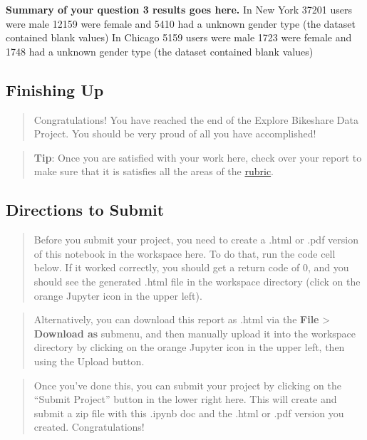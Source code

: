 \documentclass[11pt]{article}
\begin{document}
    \textbf{Summary of your question 3 results goes here.} In New York 37201
users were male 12159 were female and 5410 had a unknown gender type
(the dataset contained blank values) In Chicago 5159 users were male
1723 were female and 1748 had a unknown gender type (the dataset
contained blank values)

    \hypertarget{finishing-up}{%
\subsection{Finishing Up}\label{finishing-up}}

\begin{quote}
Congratulations! You have reached the end of the Explore Bikeshare Data
Project. You should be very proud of all you have accomplished!
\end{quote}

\begin{quote}
\textbf{Tip}: Once you are satisfied with your work here, check over
your report to make sure that it is satisfies all the areas of the
\href{https://review.udacity.com/\#!/rubrics/2508/view}{rubric}.
\end{quote}

\hypertarget{directions-to-submit}{%
\subsection{Directions to Submit}\label{directions-to-submit}}

\begin{quote}
Before you submit your project, you need to create a .html or .pdf
version of this notebook in the workspace here. To do that, run the code
cell below. If it worked correctly, you should get a return code of 0,
and you should see the generated .html file in the workspace directory
(click on the orange Jupyter icon in the upper left).
\end{quote}

\begin{quote}
Alternatively, you can download this report as .html via the
\textbf{File} \textgreater{} \textbf{Download as} submenu, and then
manually upload it into the workspace directory by clicking on the
orange Jupyter icon in the upper left, then using the Upload button.
\end{quote}

\begin{quote}
Once you've done this, you can submit your project by clicking on the
``Submit Project'' button in the lower right here. This will create and
submit a zip file with this .ipynb doc and the .html or .pdf version you
created. Congratulations!
\end{quote}
\end{document}
